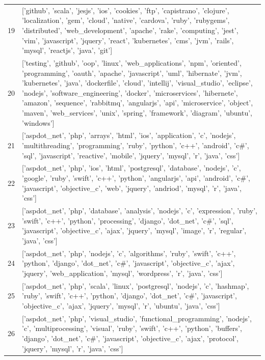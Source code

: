 \begin{center}
\begin{longtable}{|p{1.5cm}|p{12.5cm}|}
            19 & ['github', 'scala', 'jesjs', 'ios', 'cookies', 'ftp', 'capistrano', 'clojure', 'localization', 'gem', 'cloud', 'native', 'cardova', 'ruby', 'rubygems', 'distributed', 'web\_development', 'apache', 'rake', 'computing', 'jest', 'vim', 'javascript', 'jquery', 'react', 'kubernetes', 'cms', 'jvm', 'rails', 'mysql', 'reactjs', 'java', 'git']  \\ 
            20 & ['testing', 'github', 'oop', 'linux', 'web\_applications', 'npm', 'oriented', 'programming', 'oauth', 'apache', 'javascript', 'uml', 'hibernate', 'jvm', 'kubernetes', 'java', 'dockerfile', 'cloud', 'intellij', 'visual\_studio', 'eclipse', 'nodejs', 'software\_engineering', 'docker', 'microservices', 'hibernete', 'amazon', 'sequence', 'rabbitmq', 'angularjs', 'api', 'microservice', 'object', 'maven', 'web\_services', 'unix', 'spring', 'framework', 'diagram', 'ubuntu', 'windows']  \\ 
            21 & ['aspdot\_net', 'php', 'arrays', 'html', 'ios', 'application', 'c', 'nodejs', 'multithreading', 'programming', 'ruby', 'python', 'c++', 'android', 'c\#', 'sql', 'javascript', 'reactive', 'mobile', 'jquery', 'mysql', 'r', 'java', 'css']  \\ 
            22 & ['aspdot\_net', 'php', 'ios', 'html', 'postgresql', 'database', 'nodejs', 'c', 'google', 'ruby', 'swift', 'c++', 'python', 'angularjs', 'api', 'android', 'c\#', 'javascript', 'objective\_c', 'web', 'jquery', 'andriod', 'mysql', 'r', 'java', 'css']  \\ 
            23 & ['aspdot\_net', 'php', 'database', 'analysis', 'nodejs', 'c', 'expression', 'ruby', 'swift', 'c++', 'python', 'processing', 'django', 'dot\_net', 'c\#', 'sql', 'javascript', 'objective\_c', 'ajax', 'jquery', 'mysql', 'image', 'r', 'regular', 'java', 'css']  \\ 
            24 & ['aspdot\_net', 'php', 'nodejs', 'c', 'algorithms', 'ruby', 'swift', 'c++', 'python', 'django', 'dot\_net', 'c\#', 'javascript', 'objective\_c', 'ajax', 'jquery', 'web\_application', 'mysql', 'wordpress', 'r', 'java', 'css']  \\ 
            25 & ['aspdot\_net', 'php', 'scala', 'linux', 'postgresql', 'nodejs', 'c', 'hashmap', 'ruby', 'swift', 'c++', 'python', 'django', 'dot\_net', 'c\#', 'javascript', 'objective\_c', 'ajax', 'jquery', 'mysql', 'r', 'ubuntu', 'java', 'css']  \\ 
            26 & ['aspdot\_net', 'php', 'visual\_studio', 'functional\_programming', 'nodejs', 'c', 'multiprocessing', 'visual', 'ruby', 'swift', 'c++', 'python', 'buffers', 'django', 'dot\_net', 'c\#', 'javascript', 'objective\_c', 'ajax', 'protocol', 'jquery', 'mysql', 'r', 'java', 'css']  \\ 

\end{longtable}
\end{center}
